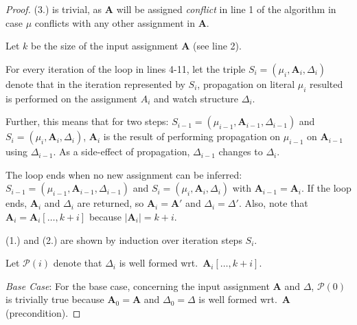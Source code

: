 \documentclass{vutinfth} %
\theoremstyle{example}
\theoremstyle{definition}
\theoremstyle{theorem}
\theoremstyle{lemma}
\theoremstyle{corollary}
\newcommand{\ass}{\mathbf{A}}
\newcommand{\abef}{\ass_{i}[\ldots, k + i]}
\newcommand{\dbef}{\Delta_{i}}
\newcommand{\welf}{well formed\xspace}
\newcommand{\sgl}{\mu}
\begin{document}
\begin{proof}


(3.) is trivial, as $\ass$ will be assigned \emph{conflict} in line 1 of the algorithm in case $\sgl$ conflicts with any other assignment in $\ass$.

Let $k$ be the size of the input assignment $\ass$ (see line 2).

For every iteration of the loop in lines 4-11, let the triple $S_i = (\sgl_i, \ass_i,  \Delta_i)$ denote that in the iteration represented by $S_i$, propagation on literal $\sgl_i$ resulted is performed on the assignment $A_i$ and watch structure $\Delta_i$.

Further, this means that for two steps: $S_{i-1} = (\sgl_{i-1}, \ass_{i-1}, \Delta_{i-1})$ and $S_i = (\sgl_i, \ass_i, \Delta_i)$, $\ass_i$ is the result of performing propagation on $\sgl_{i-1}$ on $\ass_{i-1}$ using $\Delta_{i-1}$. As a side-effect of propagation, $\Delta_{i-1}$ changes to $\Delta_i$.

The loop ends when no new assignment can be inferred: $S_{i-1} = (\sgl_{i-1}, \ass_{i-1}, \Delta_{i-1})$ and $S_i = (\sgl_i, \ass_i, \Delta_i)$ with $\ass_{i-1} = \ass_i$. If the loop ends, $\ass_i$ and $\Delta_i$ are returned, so $\ass_i = \ass'$ and $\Delta_i = \Delta'$. Also, note that $\ass_i = \ass_i[\ldots, k+i]$ because $|\ass_i| = k+i$.

(1.) and (2.) are shown by induction over iteration steps $S_i$.

Let $\mathcal{P}(i)$ denote that $\dbef$ is \welf wrt.~$\abef$.

\emph{Base Case}: For the base case, concerning the input assignment $\ass$ and $\Delta$, $\mathcal{P}(0)$ is trivially true because $\ass_0 = \ass$ and $\Delta_0 = \Delta$ is \welf wrt.~$\ass$ (precondition).


\end{proof}
\end{document}
